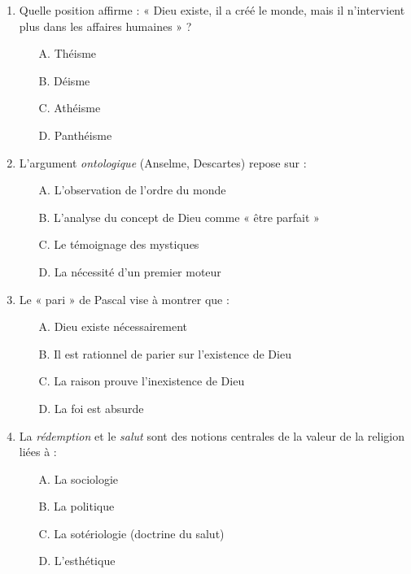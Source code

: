 \documentclass[11pt]{article}
\begin{document}
\begin{exercice}
\begin{enumerate}
    \item Quelle position affirme : « Dieu existe, il a créé le monde, mais il n'intervient plus dans les affaires humaines » ?
    \begin{itemize}
        \item[A.] Théisme \item[B.] Déisme \item[C.] Athéisme \item[D.] Panthéisme
    \end{itemize}
    \item L'argument \textit{ontologique} (Anselme, Descartes) repose sur :
    \begin{itemize}
        \item[A.] L'observation de l'ordre du monde \item[B.] L'analyse du concept de Dieu comme « être parfait » \item[C.] Le témoignage des mystiques \item[D.] La nécessité d'un premier moteur
    \end{itemize}
    \item Le « pari » de Pascal vise à montrer que :
    \begin{itemize}
        \item[A.] Dieu existe nécessairement \item[B.] Il est rationnel de parier sur l'existence de Dieu \item[C.] La raison prouve l'inexistence de Dieu \item[D.] La foi est absurde
    \end{itemize}
    \item La \textit{rédemption} et le \textit{salut} sont des notions centrales de la valeur de la religion liées à :
    \begin{itemize}
        \item[A.] La sociologie \item[B.] La politique \item[C.] La sotériologie (doctrine du salut) \item[D.] L'esthétique
    \end{itemize}
\end{enumerate}
\end{exercice}
\end{document}

